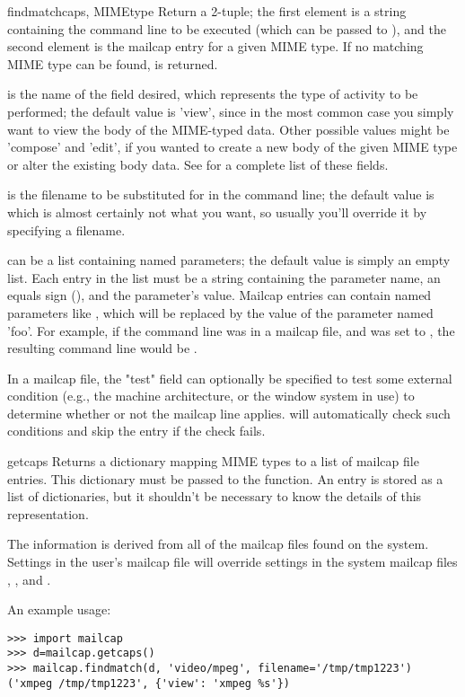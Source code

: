\begin{funcdesc}{findmatch}{caps, MIMEtype%
                            }
Return a 2-tuple; the first element is a string containing the command
line to be executed
(which can be passed to ), and the second element is
the mailcap entry for a given MIME type.  If no matching MIME
type can be found,  is returned.

 is the name of the field desired, which represents the type
of activity to be performed; the default value is 'view', since in the 
most common case you simply want to view the body of the MIME-typed
data.  Other possible values might be 'compose' and 'edit', if you
wanted to create a new body of the given MIME type or alter the
existing body data.  See  for a complete list of these
fields.

 is the filename to be substituted for  in the
command line; the default value is
 which is almost certainly not what you want, so
usually you'll override it by specifying a filename.

 can be a list containing named parameters; the default
value is simply an empty list.  Each entry in the list must be a
string containing the parameter name, an equals sign (\code{=}), and the
parameter's value.  Mailcap entries can contain 
named parameters like , which will be replaced by the
value of the parameter named 'foo'.  For example, if the command line
was in a mailcap file, and  was set to \code{['id=1',
'number=2', 'total=3']}, the resulting command line would be 
.  

In a mailcap file, the "test" field can optionally be specified to
test some external condition (e.g., the machine architecture, or the
window system in use) to determine whether or not the mailcap line
applies.   will automatically check such conditions
and skip the entry if the check fails.
\end{funcdesc}

\begin{funcdesc}{getcaps}{}
Returns a dictionary mapping MIME types to a list of mailcap file
entries. This dictionary must be passed to the 
function.  An entry is stored as a list of dictionaries, but it
shouldn't be necessary to know the details of this representation.

The information is derived from all of the mailcap files found on the
system. Settings in the user's mailcap file 
will override settings in the system mailcap files
, , and
.
\end{funcdesc}

An example usage:
\begin{verbatim}
>>> import mailcap
>>> d=mailcap.getcaps()
>>> mailcap.findmatch(d, 'video/mpeg', filename='/tmp/tmp1223')
('xmpeg /tmp/tmp1223', {'view': 'xmpeg %s'})
\end{verbatim}
